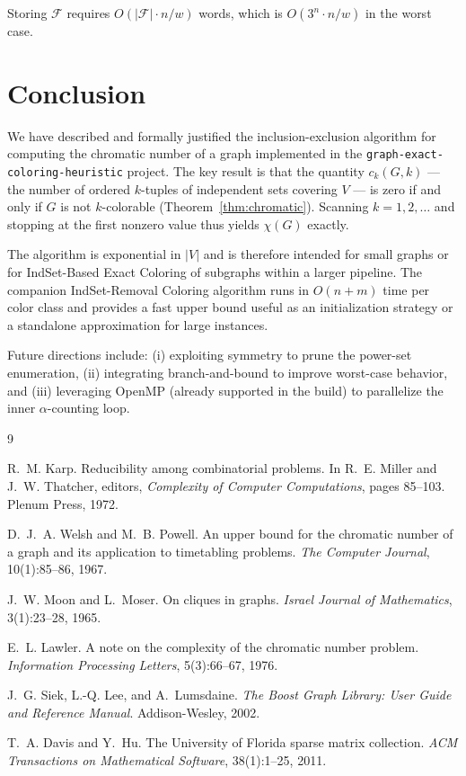 \documentclass[11pt]{article}
\begin{document}
Storing $\mathcal{F}$ requires $O(|\mathcal{F}| \cdot n/w)$ words, which is
$O(3^n \cdot n / w)$ in the worst case.

\section{Conclusion}\label{sec:conclusion}

We have described and formally justified the inclusion-exclusion algorithm for
computing the chromatic number of a graph implemented in the
\texttt{graph-exact-coloring-heuristic} project.  The key result is that the
quantity $c_k(G, k)$ --- the number of ordered $k$-tuples of independent sets
covering $V$ --- is zero if and only if $G$ is not $k$-colorable
(Theorem~\ref{thm:chromatic}).  Scanning $k = 1, 2, \ldots$ and stopping at
the first nonzero value thus yields $\chi(G)$ exactly.

The algorithm is exponential in $|V|$ and is therefore intended for small
graphs or for IndSet-Based Exact Coloring of subgraphs within a larger pipeline.
The companion IndSet-Removal Coloring algorithm runs in $O(n + m)$ time per color
class and provides a fast upper bound useful as an initialization strategy or a
standalone approximation for large instances.

Future directions include: (i) exploiting symmetry to prune the power-set
enumeration, (ii) integrating branch-and-bound to improve worst-case behavior,
and (iii) leveraging OpenMP (already supported in the build) to parallelize the
inner $\alpha$-counting loop.

\begin{thebibliography}{9}

R.~M. Karp.
\newblock Reducibility among combinatorial problems.
\newblock In R.~E. Miller and J.~W. Thatcher, editors, \emph{Complexity of
  Computer Computations}, pages 85--103. Plenum Press, 1972.

D.~J.~A. Welsh and M.~B. Powell.
\newblock An upper bound for the chromatic number of a graph and its
  application to timetabling problems.
\newblock \emph{The Computer Journal}, 10(1):85--86, 1967.

J.~W. Moon and L.~Moser.
\newblock On cliques in graphs.
\newblock \emph{Israel Journal of Mathematics}, 3(1):23--28, 1965.

E.~L. Lawler.
\newblock A note on the complexity of the chromatic number problem.
\newblock \emph{Information Processing Letters}, 5(3):66--67, 1976.

J.~G. Siek, L.-Q. Lee, and A.~Lumsdaine.
\newblock \emph{The Boost Graph Library: User Guide and Reference Manual}.
\newblock Addison-Wesley, 2002.

T.~A. Davis and Y.~Hu.
\newblock The University of Florida sparse matrix collection.
\newblock \emph{ACM Transactions on Mathematical Software}, 38(1):1--25, 2011.

\end{thebibliography}
\end{document}
